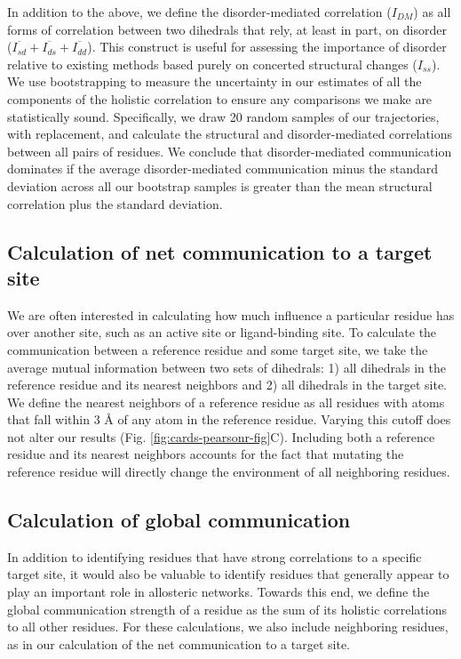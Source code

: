 \documentclass[../main.tex]{subfiles}
\begin{document}
        In addition to the above, we define the disorder-mediated correlation ($I_{DM}$) as all forms of correlation between two dihedrals that rely, at least in part, on disorder ($\overline{I_{sd}}+\overline{I_{ds}}+\overline{I_{dd}}$). This construct is useful for assessing the importance of disorder relative to existing methods based purely on concerted structural changes ($I_{ss}$). We use bootstrapping to measure the uncertainty in our estimates of all the components of the holistic correlation to ensure any comparisons we make are statistically sound. Specifically, we draw 20 random samples of our trajectories, with replacement, and calculate the structur{}al and disorder-mediated correlations between all pairs of residues. We conclude that disorder-mediated communication dominates if the average disorder-mediated communication minus the standard deviation across all our bootstrap samples is greater than the mean structural correlation plus the standard deviation.

    \subsection{Calculation of net communication to a target site}
        We are often interested in calculating how much influence a particular residue has over another site, such as an active site or ligand-binding site. To calculate the communication between a reference residue and some target site, we take the average mutual information between two sets of dihedrals: 1) all dihedrals in the reference residue and its nearest neighbors and 2) all dihedrals in the target site. We define the nearest neighbors of a reference residue as all residues with atoms that fall within 3 \AA{} of any atom in the reference residue. Varying this cutoff does not alter our results (Fig. \ref{fig:cards-pearsonr-fig}C). Including both a reference residue and its nearest neighbors accounts for the fact that mutating the reference residue will directly change the environment of all neighboring residues.

    \subsection{Calculation of global communication}
        In addition to identifying residues that have strong correlations to a specific target site, it would also be valuable to identify residues that generally appear to play an important role in allosteric networks. Towards this end, we define the global communication strength of a residue as the sum of its holistic correlations to all other residues. For these calculations, we also include neighboring residues, as in our calculation of the net communication to a target site.
\end{document}
